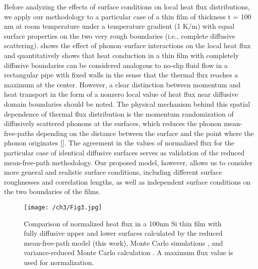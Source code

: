 Before analyzing the effects of surface conditions on local heat flux distributions, we apply our methodology to a particular case of a thin film of thickness \gls{t} = 100 nm at room temperature under a temperature gradient (1 K/\si{\micro}m) with equal surface properties on the two very rough boundaries (i.e., complete diffusive scattering).  shows the effect of phonon–surface interactions on the local heat flux and quantitatively shows that heat conduction in a thin film with completely diffusive boundaries can be considered analogous to no-slip fluid flow in a rectangular pipe with fixed walls in the sense that the thermal flux reaches a maximum at the center. However, a clear distinction between momentum and heat transport in the form of a nonzero local value of heat flux near diffusive domain boundaries should be noted. The physical mechanism behind this spatial dependence of thermal flux distribution is the momentum randomization of diffusively scattered phonons at the surfaces, which reduces the phonon mean-free-paths depending on the distance between the surface and the point where the phonon originates []. The agreement in the values of normalized flux for the particular case of identical diffusive surfaces \cite{RN445,RN276} serves as validation of the reduced mean-free-path methodology. Our proposed model, however, allows us to consider more general and realistic surface conditions, including different surface roughnesses and correlation lengths, as well as independent surface conditions on the two boundaries of the films.
\begin{figure}[hbt]
	\centering\texttt{[image: /ch3/Fig3.jpg]}
	\caption{Comparison of normalized heat flux in a 100nm Si thin film with fully diffusive upper and lower surfaces calculated by the reduced mean-free-path model (this work), Monte Carlo simulations \cite{RN445}, and variance-reduced Monte Carlo calculation \cite{RN276}. A maximum flux value is used for normalization.}
	\label{fig:ch3-comparison}
\end{figure}


